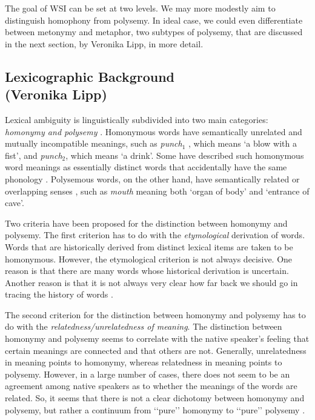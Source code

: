 \documentclass[11pt]{article}
\begin{document}

The goal of WSI can be set at two levels. We may more modestly aim to
distinguish homophony from polysemy. In ideal case, we could even differentiate
between metonymy and metaphor, two subtypes of polysemy, that are discussed in
the next section, by Veronika Lipp, in more detail.

\subsection{Lexicographic Background \\ (Veronika Lipp)}

\label{sec:bground}

Lexical ambiguity is linguistically subdivided into two main categories:
\emph{homonymy and polysemy} \citep{Cruse:2004}. Homonymous words have
semantically unrelated and mutually incompatible meanings, such as
\emph{punch$_1$} , which means `a blow with a fist', and \emph{punch$_2$},
which means `a drink'. Some have described such homonymous word meanings as
essentially distinct words that accidentally have the same phonology
\citep{Murphy:2002}. Polysemous words, on the other hand, have semantically related
or overlapping senses \citep{Cruse:2004,Jackendoff:2002,Pustejovsky:1995},
such as \emph{mouth} meaning both `organ of body' and `entrance of cave'.

Two criteria have been proposed for the distinction between homonymy and
polysemy. The first criterion has to do with the \emph{etymological} derivation
of words. Words that are historically derived from distinct lexical items are
taken to be homonymous. However, the etymological criterion is not always
decisive. One reason is that there are many words whose historical derivation
is uncertain. Another reason is that it is not always very clear how far back
we should go in tracing the history of words \citep{Lyons:1977}.

The second criterion for the distinction between homonymy and polysemy has to
do with the \emph{relatedness/unrelatedness of meaning}.  The distinction
between homonymy and polysemy seems to correlate with the native speaker’s
feeling that certain meanings are connected and that others are not. Generally,
unrelatedness in meaning points to homonymy, whereas relatedness in meaning
points to polysemy.  However, in a large number of cases, there does not seem
to be an agreement among native speakers as to whether the meanings of the
words are related. So, it seems that there is not a clear dichotomy between
homonymy and polysemy, but rather a continuum from ‘‘pure’’ homonymy to
‘‘pure’’ polysemy \citep{Lyons:1977}.
\end{document}
